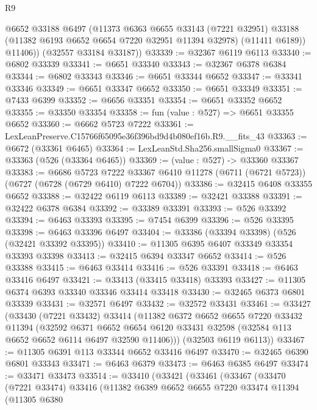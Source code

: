 \begin{lexlean}{R9}
\begin{coremodule}
          @6652
          @33188
          @6497
          (@11373
            @6363
            @6655
            @33143
            (@7221 @32951)
            @33188
            (@11382 @6193 @6652 @6654 @7220 @32951 @11394 @32978)
            (@11411 @6189))
          @11406))
      (@32557 @33184 @33187))
@33339 := @32367 @6119 @6113
@33340 := @6802 @33339
@33341 := @6651 @33340
@33343 := @32367 @6378 @6384
@33344 := @6802 @33343
@33346 := @6651 @33344 @6652
@33347 := @33341 @33346
@33349 := @6651 @33347 @6652
@33350 := @6651 @33349
@33351 := @7433 @6399
@33352 := @6656 @33351
@33354 := @6651 @33352 @6652
@33355 := @33350 @33354
@33358 := fun (value : @527) => @6651 @33355 @6652
@33360 := @6662 @5723 @7222
@33361 := LexLeanPreserve.C15766f65095e36f396bd9d4b080ef16b.R9.__fits_43
@33363 := @6672 (@33361 @6465)
@33364 := LexLeanStd.Sha256.smallSigma0
@33367 := @33363 (@526 (@33364 @6465))
@33369 := (value : @527) -> @33360 @33367
@33383 := @6686
    @5723
    @7222
    @33367
    @6410
    @11278
    (@6711 (@6721 @5723))
    (@6727 (@6728 (@6729 @6410) @7222 @6704))
@33386 := @32415 @6408 @33355 @6652
@33388 := @32422 @6119 @6113
@33389 := @32421 @33388
@33391 := @32422 @6378 @6384
@33392 := @33389 @33391
@33393 := @526 @33392
@33394 := @6463 @33393
@33395 := @7454 @6399
@33396 := @526 @33395
@33398 := @6463 @33396 @6497
@33404 := @33386 (@33394 @33398) (@526 (@32421 @33392 @33395))
@33410 := @11305 @6395 @6407 @33349 @33354 @33393 @33398
@33413 := @32415 @6394 @33347 @6652
@33414 := @526 @33388
@33415 := @6463 @33414
@33416 := @526 @33391
@33418 := @6463 @33416 @6497
@33421 := @33413 (@33415 @33418) @33393
@33427 := @11305 @6374 @6393 @33340 @33346 @33414 @33418
@33430 := @32465 @6373 @6801 @33339
@33431 := @32571 @6497
@33432 := @32572 @33431
@33461 := @33427
    (@33430
      (@7221 @33432)
      @33414
      (@11382
        @6372
        @6652
        @6655
        @7220
        @33432
        @11394
        (@32592
          @6371
          @6652
          @6654
          @6120
          @33431
          @32598
          (@32584 @113 @6652 @6652 @6114 @6497 @32590 @11406)))
      (@32503 @6119 @6113))
@33467 := @11305 @6391 @113 @33344 @6652 @33416 @6497
@33470 := @32465 @6390 @6801 @33343
@33471 := @6463 @6379
@33473 := @6463 @6385 @6497
@33474 := @33471 @33473
@33514 := @33410
    (@33421
      (@33461
        (@33467
          (@33470
            (@7221 @33474)
            @33416
            (@11382
              @6389
              @6652
              @6655
              @7220
              @33474
              @11394
              (@11305
                @6380

\end{coremodule}
\end{lexlean}
